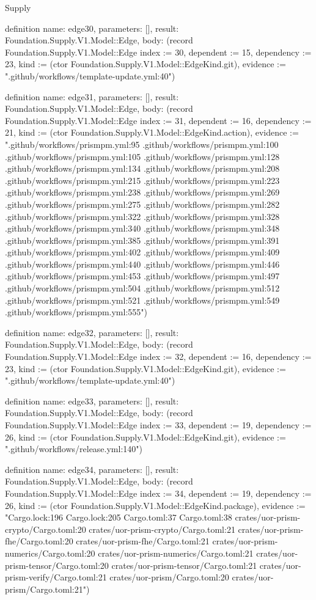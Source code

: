 \begin{lexlean}{Supply}
\begin{semanticmodule}
definition{
  name: edge30,
  parameters: [],
  result: Foundation.Supply.V1.Model::Edge,
  body: (record Foundation.Supply.V1.Model::Edge {index := 30, dependent := 15, dependency := 23, kind := (ctor Foundation.Supply.V1.Model::EdgeKind.git), evidence := ".github/workflows/template-update.yml:40"})
}

definition{
  name: edge31,
  parameters: [],
  result: Foundation.Supply.V1.Model::Edge,
  body: (record Foundation.Supply.V1.Model::Edge {index := 31, dependent := 16, dependency := 21, kind := (ctor Foundation.Supply.V1.Model::EdgeKind.action), evidence := ".github/workflows/prismpm.yml:95 .github/workflows/prismpm.yml:100 .github/workflows/prismpm.yml:105 .github/workflows/prismpm.yml:128 .github/workflows/prismpm.yml:134 .github/workflows/prismpm.yml:208 .github/workflows/prismpm.yml:215 .github/workflows/prismpm.yml:223 .github/workflows/prismpm.yml:238 .github/workflows/prismpm.yml:269 .github/workflows/prismpm.yml:275 .github/workflows/prismpm.yml:282 .github/workflows/prismpm.yml:322 .github/workflows/prismpm.yml:328 .github/workflows/prismpm.yml:340 .github/workflows/prismpm.yml:348 .github/workflows/prismpm.yml:385 .github/workflows/prismpm.yml:391 .github/workflows/prismpm.yml:402 .github/workflows/prismpm.yml:409 .github/workflows/prismpm.yml:440 .github/workflows/prismpm.yml:446 .github/workflows/prismpm.yml:453 .github/workflows/prismpm.yml:497 .github/workflows/prismpm.yml:504 .github/workflows/prismpm.yml:512 .github/workflows/prismpm.yml:521 .github/workflows/prismpm.yml:549 .github/workflows/prismpm.yml:555"})
}

definition{
  name: edge32,
  parameters: [],
  result: Foundation.Supply.V1.Model::Edge,
  body: (record Foundation.Supply.V1.Model::Edge {index := 32, dependent := 16, dependency := 23, kind := (ctor Foundation.Supply.V1.Model::EdgeKind.git), evidence := ".github/workflows/template-update.yml:40"})
}

definition{
  name: edge33,
  parameters: [],
  result: Foundation.Supply.V1.Model::Edge,
  body: (record Foundation.Supply.V1.Model::Edge {index := 33, dependent := 19, dependency := 26, kind := (ctor Foundation.Supply.V1.Model::EdgeKind.git), evidence := ".github/workflows/release.yml:140"})
}

definition{
  name: edge34,
  parameters: [],
  result: Foundation.Supply.V1.Model::Edge,
  body: (record Foundation.Supply.V1.Model::Edge {index := 34, dependent := 19, dependency := 26, kind := (ctor Foundation.Supply.V1.Model::EdgeKind.package), evidence := "Cargo.lock:196 Cargo.lock:205 Cargo.toml:37 Cargo.toml:38 crates/uor-prism-crypto/Cargo.toml:20 crates/uor-prism-crypto/Cargo.toml:21 crates/uor-prism-fhe/Cargo.toml:20 crates/uor-prism-fhe/Cargo.toml:21 crates/uor-prism-numerics/Cargo.toml:20 crates/uor-prism-numerics/Cargo.toml:21 crates/uor-prism-tensor/Cargo.toml:20 crates/uor-prism-tensor/Cargo.toml:21 crates/uor-prism-verify/Cargo.toml:21 crates/uor-prism/Cargo.toml:20 crates/uor-prism/Cargo.toml:21"})
}


\end{semanticmodule}
\end{lexlean}
